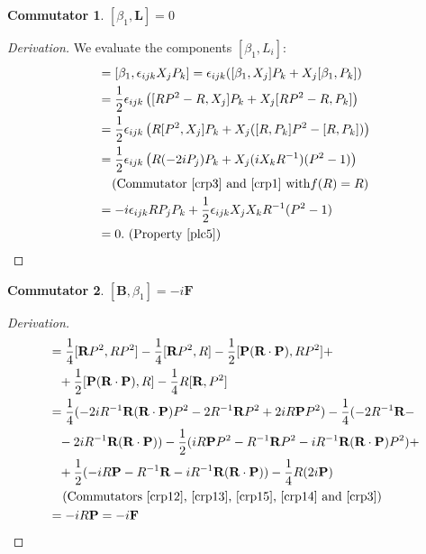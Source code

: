 \documentclass[12pt,a4paper]{report}
\theoremstyle{definition}
\newtheorem{commutator}{Commutator}[section]
\newenvironment{derivation}
  {\renewcommand\qedsymbol{$\square$}\begin{proof}[Derivation]}
  {\end{proof}}
\theoremstyle{remark}
\theoremstyle{remark}
\begin{document}
\begin{appendices}
\begin{commutator}\label{cbeta1.1}
$[\beta_1,\textbf{L}]=0$
\end{commutator}
\begin{derivation}We evaluate the components $[\beta_1,L_i]$:
\begin{align*}
[\beta_1,L_i]&=[\beta_1,\epsilon_{ijk}X_jP_k]=\epsilon_{ijk}([\beta_1,X_j]P_k+X_j[\beta_1,P_k])\\
&=\frac{1}{2}\epsilon_{ijk}\left([RP^2-R,X_j]P_k+X_j[RP^2-R,P_k]\right)\\
&=\frac{1}{2}\epsilon_{ijk}\left(R[P^2,X_j]P_k+X_j([R,P_k]P^2-[R,P_k])\right)\\
&=\frac{1}{2}\epsilon_{ijk}\left(R(-2iP_j)P_k+X_j(iX_kR^{-1})(P^2-1)\right)\\
&\phantom{=}\text{ (Commutator~\ref{crp3} and~\ref{crp1} with}f(R)=R)\\
&=-i\epsilon_{ijk}RP_jP_k+\frac{1}{2}\epsilon_{ijk}X_jX_kR^{-1}(P^2-1)\\
&=0. \text{ (Property~\ref{plc5})}
\end{align*}
\end{derivation}

\begin{commutator}\label{cbeta1.2}
$[\textbf{B},\beta_1]=-i\textbf{F}$
\end{commutator}
\begin{derivation}
\begin{align*}
[\textbf{B},\beta_1]&=\frac{1}{4}[\textbf{R}P^2,RP^2]-\frac{1}{4}[\textbf{R}P^2,R]-\frac{1}{2}[\textbf{P}(\textbf{R}\cdot\textbf{P}),RP^2]+\\
&\phantom{=}+\frac{1}{2}[\textbf{P}(\textbf{R}\cdot\textbf{P}),R]-\frac{1}{4}R[\textbf{R},P^2]\\
&=\frac{1}{4}(-2iR^{-1}\textbf{R}(\textbf{R}\cdot\textbf{P})P^2-2R^{-1}\textbf{R}P^2+2iR\textbf{P}P^2)-\frac{1}{4}(-2R^{-1}\textbf{R}-\\
&\phantom{=}-2iR^{-1}\textbf{R}(\textbf{R}\cdot\textbf{P}))-\frac{1}{2}(iR\textbf{P}P^2-R^{-1}\textbf{R}P^2-iR^{-1}\textbf{R}(\textbf{R}\cdot\textbf{P})P^2)+\\
&\phantom{=}+\frac{1}{2}(-iR\textbf{P}-R^{-1}\textbf{R}-iR^{-1}\textbf{R}(\textbf{R}\cdot\textbf{P}))-\frac{1}{4}R(2i\textbf{P})\\
&\phantom{=}\text{ (Commutators~\ref{crp12},~\ref{crp13},~\ref{crp15},~\ref{crp14} and~\ref{crp3})}\\
&=-iR\textbf{P}=-i\textbf{F}
\end{align*}
\end{derivation}


\end{appendices}
\end{document}
